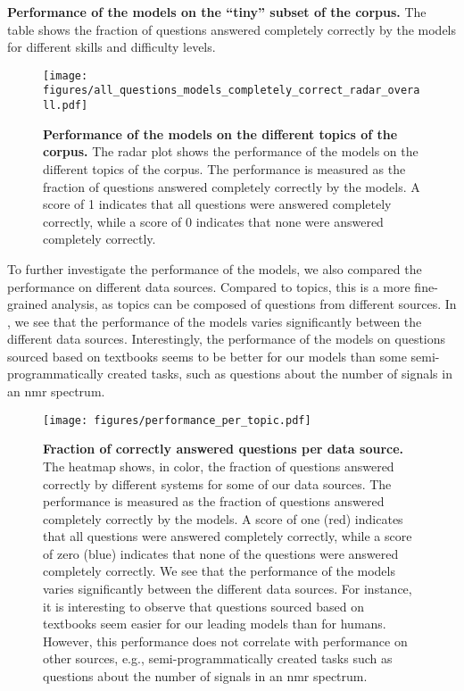 \begin{table}
    \caption{\textbf{Performance of the models on the \enquote{tiny} subset of the \chembench corpus.} The table shows the fraction of questions answered completely correctly by the models for different skills and difficulty levels.}
\end{table}

\begin{figure}[htb]
    \centering
    \texttt{[image: figures/all\_questions\_models\_completely\_correct\_radar\_overall.pdf]}
    \caption{\textbf{Performance of the models on the different topics of the \chembench corpus.} The radar plot shows the performance of the models on the different topics of the \chembench corpus. The performance is measured as the fraction of questions answered completely correctly by the models.
    A score of 1 indicates that all questions were answered completely correctly, while a score of 0 indicates that none were answered completely correctly.
    }
    \label{fig:all_questions_models_completely_correct_radar_overall}
\end{figure}


To further investigate the performance of the models, we also compared the performance on different data sources.
Compared to topics, this is a more fine-grained analysis, as topics can be composed of questions from different sources.
In , we see that the performance of the models varies significantly between the different data sources.
Interestingly, the performance of the models on questions sourced based on textbooks seems to be better for our models than some semi-programmatically created tasks, such as questions about the number of signals in an \gls{nmr} spectrum.


\begin{figure}[htb]
    \centering
    \texttt{[image: figures/performance\_per\_topic.pdf]}
    \caption{\textbf{Fraction of correctly answered questions per data source.} The heatmap shows, in color, the fraction of questions answered correctly by different systems for some of our data sources. The performance is measured as the fraction of questions answered completely correctly by the models. A score of one (red) indicates that all questions were answered completely correctly, while a score of zero (blue) indicates that none of the questions were answered completely correctly.
        We see that the performance of the models varies significantly between the different data sources. For instance, it is interesting to observe that questions sourced based on textbooks seem easier for our leading models than for humans. However, this performance does not correlate with performance on other sources, e.g., semi-programmatically created tasks such as questions about the number of signals in an \gls{nmr} spectrum.
    }
    \label{fig:performance_per_topic}
\end{figure}

